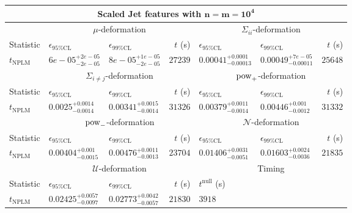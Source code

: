 \begin{tabular}{l|llr|llr}
	\toprule
	\multicolumn{7}{c}{{\bf Scaled Jet features with $\mathbf{n=m=10^{4}}$}} \\
	\toprule
	\multicolumn{1}{c}{} & \multicolumn{3}{c}{$\mu$-deformation} & \multicolumn{3}{c}{$\Sigma_{ii}$-deformation} \\
	Statistic & $\epsilon_{95\%\mathrm{CL}}$ & $\epsilon_{99\%\mathrm{CL}}$ & $t$ (s) & $\epsilon_{95\%\mathrm{CL}}$ & $\epsilon_{99\%\mathrm{CL}}$ & $t$ (s) \\
	\midrule
	$t_{\mathrm{NPLM}}$ & $6e-05_{-2e-05}^{+2e-05}$ & $8e-05_{-2e-05}^{+1e-05}$ & $27239$ & $0.00041_{-0.00013}^{+0.0001}$ & $0.00049_{-0.00011}^{+7e-05}$ & $25648$ \\
	\toprule
	\multicolumn{1}{c}{} & \multicolumn{3}{c}{$\Sigma_{i\neq j}$-deformation} & \multicolumn{3}{c}{$\rm{pow}_{+}$-deformation} \\
	Statistic & $\epsilon_{95\%\mathrm{CL}}$ & $\epsilon_{99\%\mathrm{CL}}$ & $t$ (s) & $\epsilon_{95\%\mathrm{CL}}$ & $\epsilon_{99\%\mathrm{CL}}$ & $t$ (s) \\
	\midrule
	$t_{\mathrm{NPLM}}$ & $0.0025_{-0.0014}^{+0.0014}$ & $0.00341_{-0.0014}^{+0.0015}$ & $31326$ & $0.00379_{-0.0014}^{+0.0011}$ & $0.00446_{-0.0012}^{+0.001}$ & $31332$ \\
	\toprule
	\multicolumn{1}{c}{} & \multicolumn{3}{c}{$\rm{pow}_{-}$-deformation} & \multicolumn{3}{c}{$\mathcal{N}$-deformation} \\
	Statistic & $\epsilon_{95\%\mathrm{CL}}$ & $\epsilon_{99\%\mathrm{CL}}$ & $t$ (s) & $\epsilon_{95\%\mathrm{CL}}$ & $\epsilon_{99\%\mathrm{CL}}$ & $t$ (s) \\
	\midrule
	$t_{\mathrm{NPLM}}$ & $0.00404_{-0.0015}^{+0.001}$ & $0.00476_{-0.0013}^{+0.0011}$ & $23704$ & $0.01406_{-0.0051}^{+0.0031}$ & $0.01603_{-0.0036}^{+0.0024}$ & $21835$ \\
	\toprule
	\multicolumn{1}{c}{} & \multicolumn{3}{c}{$\mathcal{U}$-deformation} & \multicolumn{3}{c}{Timing} \\
	Statistic & $\epsilon_{95\%\mathrm{CL}}$ & $\epsilon_{99\%\mathrm{CL}}$ & $t$ (s) & $t^{\mathrm{null}}$ (s) \\
	\midrule
	$t_{\mathrm{NPLM}}$ & $0.02425_{-0.0097}^{+0.0057}$ & $0.02773_{-0.0057}^{+0.0042}$ & $21830$ & $3918$ \\
	\bottomrule
\end{tabular}